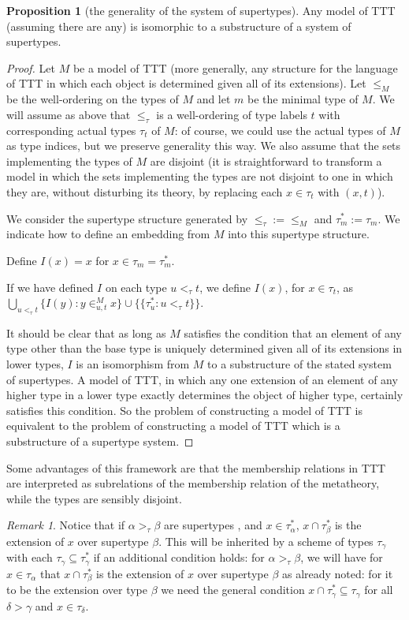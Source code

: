 \documentclass[112pt]{article}
\theoremstyle{definition}
\newtheorem{proposition}[theorem]{Proposition}
\theoremstyle{remark}
\newtheorem{remark}[theorem]{Remark}
\begin{document}
\begin{proposition}[the generality of the system of supertypes]
Any model of TTT (assuming there are any) is isomorphic to a substructure of a system of supertypes.
\end{proposition}
\begin{proof}
Let $M$ be a model of TTT (more generally, any structure for the language of TTT in which each object is determined given all of its extensions).  Let $\leq_M$ be the well-ordering on the types of $M$ and let $m$ be the minimal type of $M$.  We will assume as above that $\leq_\tau$ is a well-ordering of type labels $t$ with corresponding actual types $\tau_t$ of $M$:  of course, we could use the actual types of $M$ as type indices, but we preserve generality this way.    We also assume that the sets implementing the types of $M$ are disjoint (it is straightforward to transform a model in which the sets implementing the types are not disjoint to one in which they are, without disturbing its theory, by replacing each $x \in \tau_t$ with $(x,t)$).

We consider the supertype structure generated by ${\leq_\tau}:={\leq_M}$ and $\tau^*_m := \tau_m$.  We indicate how to define an embedding from $M$ into this supertype structure.

Define $I(x) = x$ for $x \in \tau_m = \tau^*_m$.

If we have defined $I$ on each type $u <_\tau t$, we define $I(x)$, for $x \in \tau_t$, as
$\bigcup_{u <_\tau t} \{I(y):y \in^M_{u,t} x\} \cup \{\{\tau^*_u:u <_\tau t\}\}$.

It should be clear that as long as $M$ satisfies the condition that an element of any type other than the base type is uniquely determined given all of its extensions in lower types, $I$ is an isomorphism from $M$ to a substructure of the stated system of supertypes.  A model of TTT, in which any one extension of an element of any higher type in a lower type exactly determines the object of higher type, certainly satisfies this condition.  So the problem of constructing a model of TTT is equivalent to the problem of constructing a model of TTT which is a substructure of a supertype system.
\end{proof}

Some advantages of this framework are that the membership relations in TTT are interpreted as subrelations of the membership relation of the metatheory, while the types are sensibly disjoint.

\begin{remark}
Notice that if $\alpha>_\tau \beta$ are supertypes
, and $x \in \tau^*_\alpha$, $x \cap \tau^*_\beta$ is the extension of $x$ over supertype $\beta$.  This will be inherited by a scheme of types $\tau_\gamma$ with each $\tau_\gamma \subseteq \tau^*_\gamma$ if an additional condition holds:  for $\alpha>_\tau\beta$, we will have
for $x \in \tau_\alpha$ that $x \cap \tau^*_\beta$ is the extension of $x$ over supertype $\beta$ as already noted:  for it to be the extension over type $\beta$ we need the general condition $x \cap \tau^*_\gamma \subseteq \tau_\gamma$ for all $\delta>\gamma$ and $x \in \tau_\delta$.
\end{remark}
\end{document}
